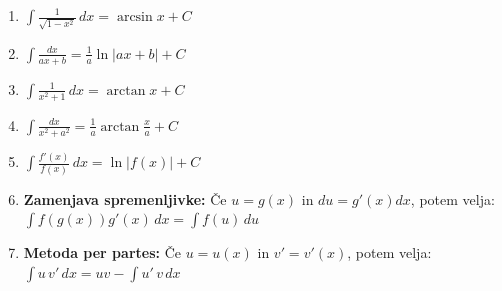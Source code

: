 \begin{center}
\begin{small}
\begin{enumerate}
\begin{math}
			      \end{math}
			\item \begin{math}
				      \int {\frac{1}{\sqrt{1-x^2}}} \, dx = \arcsin {x} + C
			      \end{math}
			\item \begin{math}
				      \int \frac{dx}{ax + b} = \frac{1}{a} \ln |ax + b| + C
			      \end{math}
			\item \begin{math}
				      \int \frac{1}{x^2 + 1} \, dx = \arctan x + C
			      \end{math}
			\item \begin{math}
				      \int \frac{dx}{x^2 + a^2} = \frac{1}{a} \arctan \frac{x}{a} + C
			      \end{math}
			\item \begin{math}
				      \int \frac{f'(x)}{f(x)} \, dx = \ln|f(x)| + C
			      \end{math}
			\item \textbf{Zamenjava spremenljivke:} Če $u = g(x)$ in $du = g'(x)dx$, potem velja:
			      \begin{math}
				      \int f(g(x))g'(x)\,dx = \int f(u)\,du
			      \end{math}
			\item \textbf{Metoda per partes:} Če $u = u(x)$ in $v' = v'(x)$, potem velja:
			      \begin{math}
				      \int u\,v'\,dx = uv - \int u'\,v\,dx
			      \end{math}
		\end{enumerate}
	\end{small}
\end{center}

